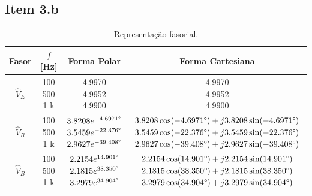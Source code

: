 \documentclass[11pt]{article}
\begin{document}
\subsection*{Item 3.b}

\begin{table}[h!]
  \centering
  \begin{tabular}{|c|c|c|c|}
    \hline
    Fasor             & $f$ [Hz]      & Forma Polar & Forma Cartesiana \\
    \hline
    $\widehat{V}_{E}$ & \makecell{100                                  \\500\\1 k} &\makecell{4.9970                                        \\ 4.9952 \\ 4.9900}                                      & \makecell{4.9970                                        \\ 4.9952 \\ 4.9900}           \\
    \hline
    $\widehat{V}_{R}$ & \makecell{100                                  \\500 \\1 k} &\makecell{$3.8208e^{-4.6971\degree}$                    \\ $3.5459e^{-22.376\degree}$ \\ $2.9627e^{-39.408\degree}$} & \makecell{$3.8208\cos(-4.6971\degree) + j3.8208\sin(-4.6971\degree)$                    \\ $3.5459\cos(-22.376\degree) + j3.5459\sin(-22.376\degree)$ \\  $2.9627\cos(-39.408\degree) + j2.9627\sin(-39.408\degree)$}           \\
    \hline
    $\widehat{V}_{B}$ & \makecell{100                                  \\500 \\1 k} & \makecell{ $2.2154e^{14.901\degree}$                     \\$2.1815e^{38.350\degree}$ \\$3.2979e^{34.904\degree}$}   & \makecell{$2.2154\cos(14.901\degree) + j2.2154\sin(14.901\degree)$                    \\  $2.1815\cos(38.350\degree) + j2.1815\sin(38.350\degree)$ \\ $3.2979\cos(34.904\degree) + j3.2979\sin(34.904\degree)$}           \\
    \hline
  \end{tabular}
  \caption{Representação fasorial.}
\end{table}
\end{document}
